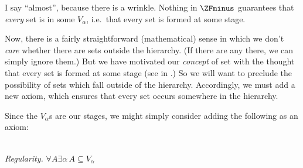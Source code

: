 \documentclass[../../../include/open-logic-section]{subfiles}
\begin{document}
I say ``almost'', because there is a wrinkle. Nothing in $\ZFminus$ guarantees that \emph{every} set is in some $V_\alpha$, i.e.\ that every set is formed at some stage. 

Now, there is a fairly straightforward (mathematical) sense in which we don't \emph{care} whether there are sets outside the hierarchy. (If there are any there, we can simply ignore them.) But we have motivated our \emph{concept} of set with the thought that every set is formed at some stage (see \stageshier{} in .) So we will want to preclude the possibility of sets which fall outside of the hierarchy. Accordingly, we must add a new axiom, which ensures that every set occurs somewhere in the hierarchy. 

Since the $V_\alpha$s are our stages, we might simply consider adding the following as an axiom:

\
\\\emph{Regularity.} $\forall A \exists \alpha\, A \subseteq V_\alpha$
\end{document}
